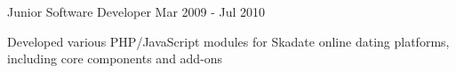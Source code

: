 \begin{cventries}
  \cventry
    {Junior Software Developer} %
    {} %
    {} %
    {Mar 2009 - Jul 2010} %
    {
      \begin{cvitems}
        \item Developed various PHP/JavaScript modules for Skadate online dating platforms, including core components and add-ons
      \end{cvitems}
    }

\end{cventries}
